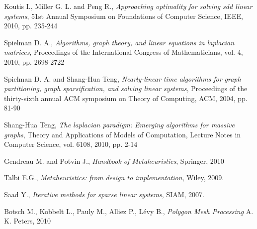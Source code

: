 \documentclass[10pt, a4paper, twocolumn]{article} %
\begin{document}

\begin{thebibliography}{99} %

Koutis I., Miller G. L. and Peng R., 
\newblock \textit{Approaching optimality for solving sdd linear systems}, 
\newblock 51st Annual Symposium on Foundations of Computer Science, IEEE, 
2010, pp. 235-244

Spielman D. A.,
\newblock \textit{Algorithms, graph theory, and linear equations in laplacian 
matrices}, 
\newblock Proceedings of the International Congress of Mathematicians, vol. 4, 
2010, pp. 2698-2722

Spielman D. A. and Shang-Hua Teng,
\newblock \textit{Nearly-linear time algorithms for graph partitioning, graph 
sparsification, and solving linear systems}, 
\newblock Proceedings of the thirty-sixth annual ACM symposium on Theory of 
Computing, ACM, 2004, pp. 81-90

Shang-Hua Teng,
\newblock \textit{The laplacian paradigm: Emerging algorithms for massive 
graphs}, 
\newblock Theory and Applications of Models of Computation, Lecture Notes in 
Computer Science, vol. 6108, 2010, pp. 2-14

Gendreau M. and Potvin J., 
\newblock \textit{Handbook of Metaheuristics}, 
\newblock Springer, 2010

Talbi E.G., 
\newblock \textit{Metaheuristics: from design to implementation}, 
\newblock Wiley, 2009.

Saad Y., 
\newblock \textit{Iterative methods for sparse linear systems}, 
\newblock SIAM, 2007.

Botsch M., Kobbelt L., Pauly M., Alliez P., Lévy B.,
\newblock \textit{Polygon Mesh Processing}
\newblock A. K. Peters, 2010

\end{thebibliography}

\end{document}
